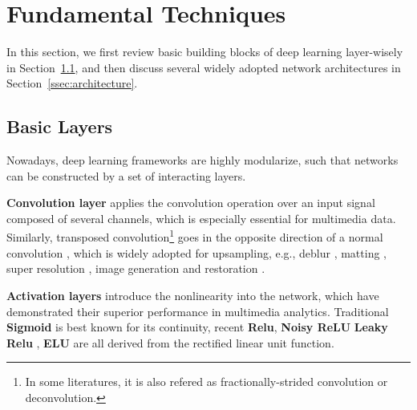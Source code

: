 \section{Fundamental Techniques}
\label{sec:funda}

In this section, we first review basic building blocks of deep learning layer-wisely in Section~\ref{ssec:layers}, and then discuss several widely adopted network architectures in Section~\ref{ssec:architecture}.

\subsection{Basic Layers}
\label{ssec:layers}

Nowadays, deep learning frameworks are highly modularize, such that networks can be constructed by a set of interacting layers. 

\textbf{Convolution layer} \cite{NIPS2012_4824} applies the convolution operation over an input signal composed of several channels, which is especially essential for multimedia data. 
Similarly,  transposed convolution\footnote{In some literatures, it is also refered as fractionally-strided convolution or deconvolution.} goes in the opposite direction of a normal convolution \cite{arXiv:1603.07285}, which is widely adopted for upsampling, e.g., deblur \cite{su2016deep}, matting \cite{deepmatting}, super resolution \cite{}, image generation \cite{dcgan} and restoration \cite{NIPS2016}.





\textbf{Activation layers} introduce the nonlinearity into the network, which have demonstrated their superior performance in multimedia analytics. Traditional \textbf{Sigmoid} is best known for its continuity, recent \textbf{Relu}, \textbf{Noisy ReLU} \cite{Hinton_rectifiedlinear} \textbf{Leaky Relu} \cite{Maas13rectifiernonlinearities}, \textbf{ELU} \cite{journals/corr/ClevertUH15} are all derived from the rectified linear unit function. 

